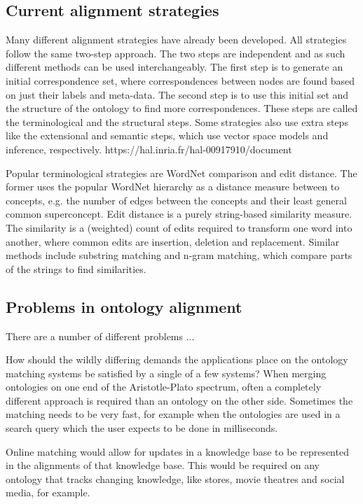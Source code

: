 \documentclass{article}
\begin{document}
 \subsection{Current alignment strategies} \label{strategies}
 Many different alignment strategies have already been developed. All strategies follow the same two-step approach. The two steps are independent and as such different methods can be used interchangeably. The first step is to generate an initial correspondence set, where correspondences between nodes are found based on just their labels and meta-data. The second step is to use this initial set and the structure of the ontology to find more correspondences. These steps are called the terminological and the structural steps. Some strategies also use extra steps like the extensional and semantic steps, which use vector space models and inference, respectively. https://hal.inria.fr/hal-00917910/document
 
 Popular terminological strategies are WordNet comparison and edit distance. The former uses the popular WordNet hierarchy as a distance measure between to concepts, e.g. the number of edges between the concepts and their least general common superconcept. \cite{lin2008}
 Edit distance is a purely string-based similarity measure. The similarity is a (weighted) count of edits required to transform one word into another, where common edits are insertion, deletion and replacement. Similar methods include substring matching and n-gram matching, which compare parts of the strings to find similarities.\cite{singh2014, levenshtein}
 \subsection{Problems in ontology alignment}
 There are a number of different problems ... %
 
 How should the wildly differing demands the applications place on the ontology matching systems be satisfied by a single of a few systems? When merging ontologies on one end of the Aristotle-Plato spectrum, often a completely different approach is required than an ontology on the other side. Sometimes the matching needs to be very fast, for example when the ontologies are used in a search query which the user expects to be done in milliseconds.
 
 Online matching would allow for updates in a knowledge base to be represented in the alignments of that knowledge base. This would be required on any ontology that tracks changing knowledge, like stores, movie theatres and social media, for example.
 
\end{document}
